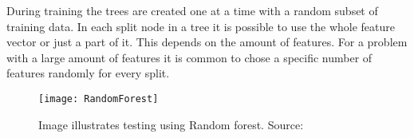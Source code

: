 During training the trees are created one at a time with a random subset of training data. In each split node in a tree it is possible to use the whole feature vector or just a part of it. This depends on the amount of features. For a problem with a large amount of features it is common to chose a specific number of features randomly for every split.  

\begin{figure}[H]
\centering
	\texttt{[image: RandomForest]}
	\caption{Image illustrates testing using Random forest. Source: \citep{Criministri:2011}}
	\label{randomforest}
\end{figure}
 

